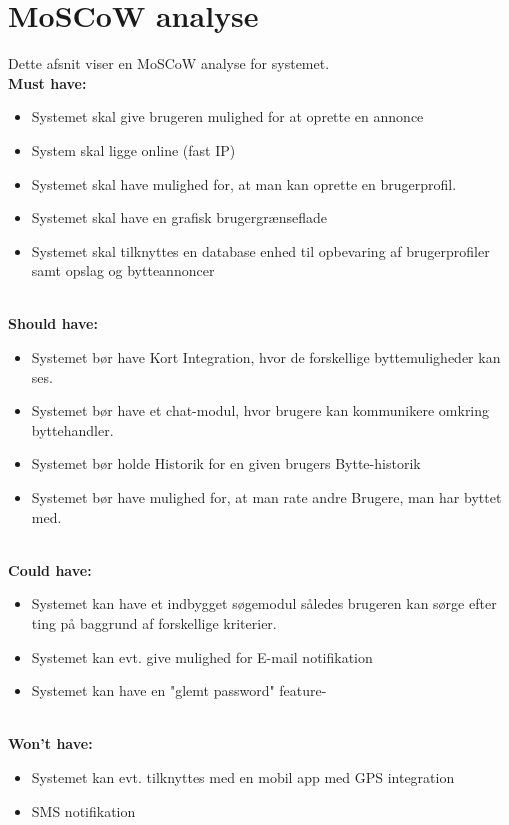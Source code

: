 \chapter{MoSCoW analyse}
Dette afsnit viser en MoSCoW analyse for systemet. \\
\textbf{Must have:}
\begin{itemize}[noitemsep]
	\item Systemet skal give brugeren mulighed for at oprette en annonce
	\item System skal ligge online (fast IP)
	\item Systemet skal have mulighed for, at man kan oprette en brugerprofil.
	\item Systemet skal have en grafisk brugergrænseflade
	\item Systemet skal tilknyttes en database enhed til opbevaring af brugerprofiler samt opslag og bytteannoncer 
	
\end{itemize}

\textbf{\\Should have:}
\begin{itemize}[noitemsep]
	\item Systemet bør have Kort Integration, hvor de forskellige byttemuligheder kan ses.
	\item Systemet bør have et chat-modul, hvor brugere kan kommunikere omkring byttehandler.
	\item Systemet bør holde Historik for en given brugers Bytte-historik
	\item Systemet bør have mulighed for, at man rate andre Brugere, man har byttet med.
	
\end{itemize}

\textbf{\\Could have:}
\begin{itemize}[noitemsep]
	\item Systemet kan have et indbygget søgemodul således brugeren kan sørge efter ting på baggrund af forskellige kriterier.
	\item Systemet kan evt. give mulighed for E-mail notifikation
	\item Systemet kan have en "glemt password" feature-
\end{itemize}

\textbf{\\Won't have:}
\begin{itemize}[noitemsep]
	\item Systemet kan evt. tilknyttes med en mobil app med GPS integration
	\item SMS notifikation 

\end{itemize}
